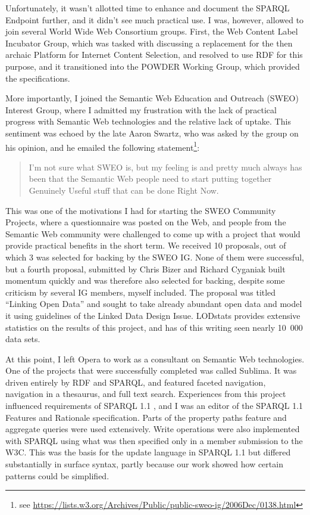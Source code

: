 Unfortunately, it wasn't allotted time to enhance and document the
SPARQL Endpoint further, and it didn't see much practical use. 
I was, however, allowed to join several World Wide Web Consortium
groups. First, the Web Content Label Incubator Group, which was tasked
with discussing a replacement for the then archaic Platform for
Internet Content Selection, and resolved to use RDF for this
purpose, and it transitioned into the POWDER Working Group, which
provided the specifications. 

More importantly, I joined the Semantic Web Education and Outreach
(SWEO) Interest Group, where I admitted my frustration with the lack
of practical progress with Semantic Web technologies and the relative
lack of uptake. This sentiment was echoed by the late Aaron Swartz,
who was asked by the group on his opinion, and he emailed the
following statement\footnote{see
  \url{https://lists.w3.org/Archives/Public/public-sweo-ig/2006Dec/0138.html}}:
\begin{quote}
I'm not sure what SWEO is, but my feeling is and pretty much always
has been that the Semantic Web people need to start putting together
Genuinely Useful stuff that can be done Right Now.
\end{quote}

This was one of the motivations I had for starting the SWEO Community
Projects, where a questionnaire was posted on the Web, and people from
the Semantic Web community were challenged to come up with a project
that would provide practical benefits in the short term. We received
10 proposals, out of which 3 was selected for backing by the SWEO
IG. None of them were successful, but a fourth proposal, submitted by
Chris Bizer and Richard Cyganiak built momentum quickly and was
therefore also selected for backing, despite some criticism by several
IG members, myself included. The proposal was titled ``Linking Open
Data'' and sought to take already abundant open data and model it
using guidelines of the Linked Data Design
Issue\cite{linkeddataissue}. LODstats\cite{auer2012lodstats} provides
extensive statistics on the results of this project, and has of this
writing seen nearly 10~000 data sets.

At this point, I left Opera to work as a consultant on Semantic Web
technologies. One of the projects that were successfully completed was
called Sublima\cite{sublima}. It was driven entirely by RDF and SPARQL,
and featured faceted navigation, navigation in a thesaurus, and full
text search. Experiences from this project influenced requirements of
SPARQL 1.1 \cite{sparql11query}, and I was an editor of the SPARQL 1.1 Features and
Rationale specification\cite{sparql11new}. Parts of the property paths
feature and aggregate queries were used extensively. Write operations
were also implemented with SPARQL using what was then specified only
in a member submission to the W3C\cite{seaborne2008sparql}. This was the basis for
the update language in SPARQL 1.1 but differed substantially in
surface syntax, partly because our work showed how certain patterns
could be simplified. 

